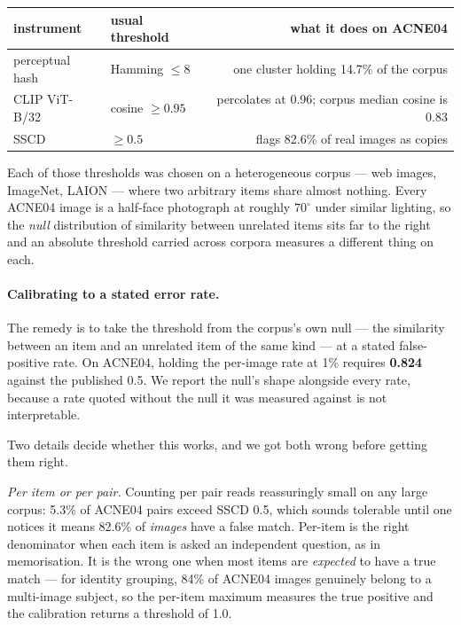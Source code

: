 \documentclass[11pt]{article}
\begin{document}
\begin{center}
\begin{tabular}{llr}
\toprule
instrument & usual threshold & what it does on ACNE04 \\
\midrule
perceptual hash & Hamming $\leq 8$ & one cluster holding 14.7\% of the corpus \\
CLIP ViT-B/32 & cosine $\geq 0.95$ & percolates at 0.96; corpus median cosine is 0.83 \\
SSCD \citep{somepalli2023replication} & $\geq 0.5$ & flags 82.6\% of real images as copies \\
\bottomrule
\end{tabular}
\end{center}

Each of those thresholds was chosen on a heterogeneous corpus --- web images, ImageNet,
LAION --- where two arbitrary items share almost nothing. Every ACNE04 image is a half-face
photograph at roughly $70^\circ$ under similar lighting, so the \emph{null} distribution of
similarity between unrelated items sits far to the right and an absolute threshold carried
across corpora measures a different thing on each.

\paragraph{Calibrating to a stated error rate.}
The remedy is to take the threshold from the corpus's own null --- the similarity between
an item and an unrelated item of the same kind --- at a stated false-positive rate. On
ACNE04, holding the per-image rate at 1\% requires \textbf{0.824} against the published
0.5. We report the null's shape alongside every rate, because a rate quoted without the
null it was measured against is not interpretable.

Two details decide whether this works, and we got both wrong before getting them right.

\emph{Per item or per pair.} Counting per pair reads reassuringly small on any large
corpus: 5.3\% of ACNE04 pairs exceed SSCD 0.5, which sounds tolerable until one notices it
means 82.6\% of \emph{images} have a false match. Per-item is the right denominator when
each item is asked an independent question, as in memorisation. It is the wrong one when
most items are \emph{expected} to have a true match --- for identity grouping, 84\% of
ACNE04 images genuinely belong to a multi-image subject, so the per-item maximum measures
the true positive and the calibration returns a threshold of 1.0.
\end{document}
